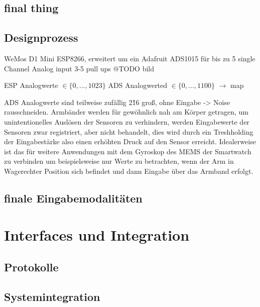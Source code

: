 \documentclass[12pt, a4paper]{article}
\begin{document}
\subsection{final thing}

\subsection{Designprozess}

WeMos D1 Mini ESP8266, erweitert um ein Adafruit ADS1015 für bis zu 5 single Channel Analog input 3-5 pull ups
@TODO bild

ESP Analogwerte $\in \{0,...,1023\}$
ADS Analogwerted $\in \{0,...,1100\}$ $\to $ map 

ADS Analogwerte sind teilweise zufällig 2\^16 groß, ohne Eingabe -> Noise rausschneiden. Armbänder werden für gewöhnlich nah am Körper getragen, um unintentionelles Auslösen der Sensoren zu verhindern, werden Eingabewerte der Sensoren zwar registriert, aber nicht behandelt, dies wird durch ein Treshholding der Eingabestärke also einen erhöhten Druck auf den Sensor erreicht. Idealerweise ist das für weitere Anwendungen mit dem Gyroskop des MEMS der Smartwatch zu verbinden um beispielsweise nur Werte zu betrachten, wenn der Arm in Wagerechter Position sich befindet und dann Eingabe über das Armband erfolgt. 


\subsection{finale Eingabemodalitäten}

\section{Interfaces und Integration}

\subsection{Protokolle}

\subsection{Systemintegration}
\end{document}
